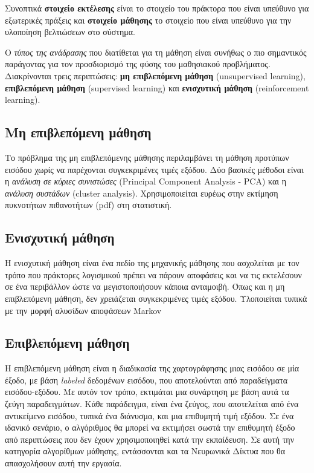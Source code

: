 Συνοπτικά \textbf{στοιχείο εκτέλεσης} είναι το στοιχείο του πράκτορα που είναι υπεύθυνο για εξωτερικές πράξεις και \textbf{στοιχείο μάθησης} το στοιχείο που είναι υπεύθυνο για την υλοποίηση βελτιώσεων στο σύστημα.

Ο \textit{τύπος της ανάδρασης} που διατίθεται για τη μάθηση είναι συνήθως ο πιο σημαντικός παράγοντας για τον προσδιορισμό της φύσης του μαθησιακού προβλήματος. Διακρίνονται τρεις περιπτώσεις: \textbf{μη επιβλεπόμενη μάθηση} (unsupervised learning), \textbf{επιβλεπόμενη μάθηση} (supervised learning) και \textbf{ενισχυτική μάθηση} (reinforcement learning).

\subsection{Μη επιβλεπόμενη μάθηση}
Το πρόβλημα της μη επιβλεπόμενης μάθησης περιλαμβάνει τη μάθηση προτύπων εισόδου χωρίς να παρέχονται συγκεκριμένες τιμές εξόδου. Δύο βασικές μέθοδοι είναι η \textit{ανάλυση σε κύριες συνιστώσες} (Principal Component Analysis - PCA) και η \textit{ανάλυση συστάδων} (cluster analysis). Χρησιμοποιείται ευρέως στην εκτίμηση πυκνοτήτων πιθανοτήτων (pdf) στη στατιστική.

\subsection{Ενισχυτική μάθηση}
Η ενισχυτική μάθηση είναι ένα πεδίο της μηχανικής μάθησης που ασχολείται με τον τρόπο που πράκτορες λογισμικού πρέπει να πάρουν αποφάσεις και να τις εκτελέσουν σε ένα περιβάλλον ώστε να μεγιστοποιήσουν κάποια ανταμοιβή. Όπως και η μη επιβλεπόμενη μάθηση, δεν χρειάζεται συγκεκριμένες τιμές εξόδου. Υλοποιείται τυπικά με την μορφή αλυσίδων αποφάσεων Markov

\subsection{Επιβλεπόμενη μάθηση}
H επιβλεπόμενη μάθηση είναι η διαδικασία της χαρτογράφησης μιας εισόδου σε μία έξοδο, με βάση \textit{labeled} δεδομένων εισόδου, που αποτελούνται από παραδείγματα εισόδου-εξόδου. Με αυτόν τον τρόπο, εκτιμάται μια συνάρτηση με βάση αυτά τα ζεύγη παραδειγμάτων. Κάθε παράδειγμα, είναι ένα ζεύγος, που αποτελείται από ένα αντικείμενο εισόδου, τυπικά ένα διάνυσμα, και μια επιθυμητή τιμή εξόδου. Σε ένα ιδανικό σενάριο, ο αλγόριθμος θα μπορεί να εκτιμήσει σωστά την επιθυμητή έξοδο από περιπτώσεις που δεν έχουν χρησιμοποιηθεί κατά την εκπαίδευση. Σε αυτή την κατηγορία αλγορίθμων μάθησης, εντάσσονται και τα Νευρωνικά Δίκτυα που θα απασχολήσουν αυτή την εργασία.

